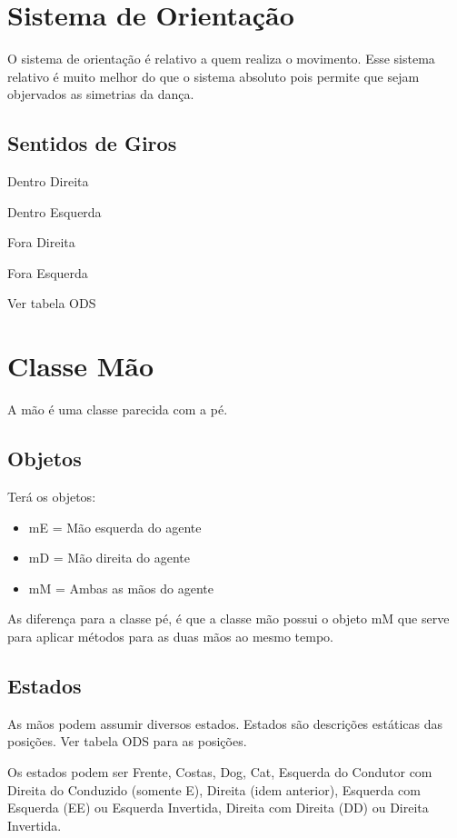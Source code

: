 
\section{Sistema de Orientação}

O sistema de orientação é relativo a quem realiza o movimento. Esse sistema relativo é muito melhor do que o sistema absoluto pois permite que sejam objervados as simetrias da dança.


\subsection{Sentidos de Giros}


Dentro Direita

Dentro Esquerda

Fora Direita

Fora Esquerda

Ver tabela ODS



\section{Classe Mão}


A mão é uma classe parecida com a pé.

\subsection{Objetos}

Terá os objetos:

\begin{itemize}
	\item mE = Mão esquerda do agente
	\item mD = Mão direita do agente
	\item mM = Ambas as mãos do agente 
\end{itemize}

As diferença para a classe pé, é que a classe mão possui o objeto mM que serve para aplicar métodos para as duas mãos ao mesmo tempo.

\subsection{Estados}

As mãos podem assumir diversos estados. Estados são descrições estáticas das posições. Ver tabela ODS para as posições.

Os estados podem ser Frente, Costas, Dog, Cat, Esquerda do Condutor com Direita do Conduzido (somente E), Direita (idem anterior), Esquerda com Esquerda (EE) ou Esquerda Invertida, Direita com Direita (DD) ou Direita Invertida.

